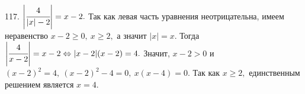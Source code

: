 117. $\left|\cfrac{4}{|x|-2}\right|=x-2.$ Так как левая часть уравнения неотрицательна, имеем неравенство $x-2\geqslant0,\ x\geqslant2,$ а значит $|x|=x.$ Тогда
$\left|\cfrac{4}{x-2}\right|=x-2\Leftrightarrow |x-2|(x-2)=4.$ Значит, $x-2>0$ и $(x-2)^2=4,\ (x-2)^2-4=0,\ x(x-4)=0.$ Так как $x\geqslant2,$ единственным решением является $x=4.$\\

